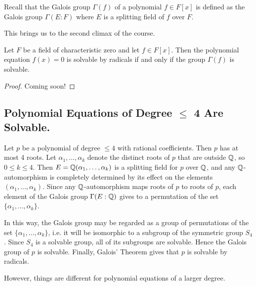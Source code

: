 Recall that the Galois group $\Gamma(f)$ of a polynomial $f \in F[x]$ is defined as the Galois group $\Gamma(E : F)$ where $E$ is a splitting field of $f$ over $F$.

This brings us to the second climax of the course.

\begin{theorem}
	Let $F$ be a field of characteristic zero and let $f \in F[x]$. Then the polynomial equation $f(x) = 0$ is solvable by radicals if and only if the group $\Gamma(f)$ is solvable.
	\begin{proof}
		Coming soon!
	\end{proof}
\end{theorem}

\subsection{Polynomial Equations of Degree \texorpdfstring{$\leq$}{Less Than or Equal to} 4 Are Solvable.}
Let $p$ be a polynomial of degree $\leq 4$ with rational coefficients. Then $p$ has at most 4 roots. Let $\alpha_1, \dots, \alpha_k$ denote the distinct roots of $p$ that are outside $\mathbb{Q}$, so $0 \leq k \leq 4$. Then $E = \mathbb{Q}(\alpha_1, \dots, \alpha_k)$ is a splitting field for $p$ over $\mathbb{Q}$, and any $\mathbb{Q}$-automorphism is completely determined by its effect on the elements $(\alpha_1, \dots, \alpha_k)$. Since any $\mathbb{Q}$-automorphism maps roots of $p$ to roots of $p$, each element of the Galois group $\Gamma(E : \mathbb{Q})$ gives to a permutation of the set $\{\alpha_1, \dots, \alpha_k\}$.

In this way, the Galois group may be regarded as a group of permutations of the set $\{\alpha_1, \dots, \alpha_k\}$, i.e. it will be isomorphic to a subgroup of the symmetric group $S_4$. Since $S_4$ is a solvable group, all of its subgroups are solvable. Hence the Galois group of $p$ is solvable. Finally, Galois' Theorem gives that $p$ is solvable by radicals.

However, things are different for polynomial equations of a larger degree.

